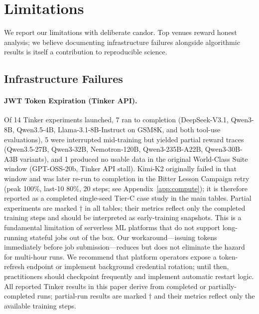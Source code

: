 \documentclass{article}
\begin{document}
\section{Limitations}
\label{sec:limitations}

We report our limitations with deliberate candor. Top venues reward honest
analysis; we believe documenting infrastructure failures alongside algorithmic
results is itself a contribution to reproducible science.

\subsection{Infrastructure Failures}
\label{sec:infra_failures}

\paragraph{JWT Token Expiration (Tinker API).}
Of 14 Tinker experiments launched, 7 ran to completion (DeepSeek-V3.1,
Qwen3-8B, Qwen3.5-4B, Llama-3.1-8B-Instruct on GSM8K, and both tool-use
evaluations), 5 were interrupted mid-training but yielded partial reward
traces (Qwen3.5-27B, Qwen3-32B, Nemotron-120B, Qwen3-235B-A22B,
Qwen3-30B-A3B variants), and 1 produced no usable data in the original
World-Class Suite window (GPT-OSS-20b, Tinker API stall). Kimi-K2
originally failed in that window and was later re-run to completion in
the Bitter Lesson Campaign retry (peak 100\%, last-10 80\%, 20 steps;
see Appendix~\ref{app:compute}); it is therefore reported as a
completed single-seed Tier-C case study in the main tables.
Partial experiments are marked $\dagger$ in all tables; their
metrics reflect only the completed training steps and should be interpreted
as early-training snapshots. This is a fundamental
limitation of serverless ML platforms that do not support long-running
stateful jobs out of the box. Our workaround---issuing tokens immediately
before job submission---reduces but does not eliminate the hazard for
multi-hour runs. We recommend that platform operators expose a token-refresh
endpoint or implement background credential rotation; until then, practitioners
should checkpoint frequently and implement automatic restart logic. All
reported Tinker results in this paper derive from completed or partially-completed
runs; partial-run results are marked $\dagger$ and their metrics reflect
only the available training steps.
\end{document}
